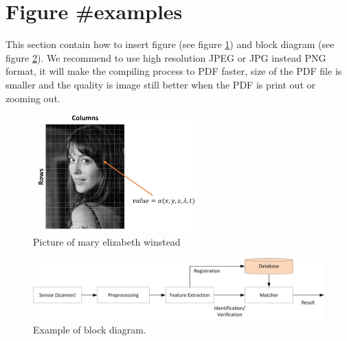 \section{Figure \#examples}
This section contain how to insert figure (see figure \ref{fig:digital}) and block diagram (see figure \ref{blo:biometrics}). We recommend to use high resolution JPEG or JPG instead PNG format, it will make the compiling process to PDF faster, size of the PDF file is smaller and the quality is image still better when the PDF is print out or zooming out.
	\begin{figure}[H]
		\centering
		\includegraphics[width=2.5in]{figure/fig_digital}
		\caption{Picture of mary elizabeth winstead}
		\label{fig:digital}
	\end{figure}	


	\begin{figure}[H]
		\centering
		\includegraphics[width=5.5in]{block/gen_biometrics}
		\caption{Example of block diagram.}
		\label{blo:biometrics}
	\end{figure}	
	
